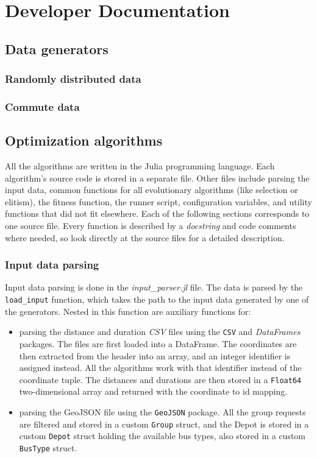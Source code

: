 \chapter{Developer Documentation}

\section{Data generators}


\subsection{Randomly distributed data}

\subsection{Commute data}

\section{Optimization algorithms}

All the algorithms are written in the Julia programming language. Each algorithm's source code is stored in a separate file. Other files include parsing the input data, common functions for all evolutionary algorithms (like selection or elitism), the fitness function, the runner script, configuration variables, and utility functions that did not fit elsewhere. Each of the following sections corresponds to one source file. Every function is described by a \textit{docstring} and code comments where needed, so look directly at the source files for a detailed description.

\subsection{Input data parsing}

Input data parsing is done in the \textit{input\_parser.jl} file. The data is parsed by the \texttt{load\_input} function, which takes the path to the input data generated by one of the generators. Nested in this function are auxiliary functions for:
\begin{itemize}
    \setlength\itemsep{0pt}
    \item parsing the distance and duration \textit{CSV} files using the \texttt{CSV} and \textit{DataFrames} packages. The files are first loaded into a DataFrame. The coordinates are then extracted from the header into an array, and an integer identifier is assigned instead. All the algorithms work with that identifier instead of the coordinate tuple. The distances and durations are then stored in a \texttt{Float64} two-dimensional array and returned with the coordinate to id mapping.
    \item parsing the GeoJSON file using the \texttt{GeoJSON} package. All the group requests are filtered and stored in a custom \texttt{Group} struct, and the Depot is stored in a custom \texttt{Depot} struct holding the available bus types, also stored in a custom \texttt{BusType} struct.
\end{itemize}

